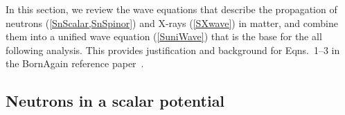 In this section, we review the wave equations that describe the propagation
of neutrons (\cref{SnScalar,SnSpinor}) and X-rays (\cref{SXwave}) in matter,
and combine them into a unified wave equation (\cref{SuniWave})
that is the base for the all following analysis.
This provides justification and background
for Eqns.~1--3 in the BornAgain reference paper~\cite{PoHB20}.

\subsection{Neutrons in a scalar potential}\label{SnScalar}
%
%

\def\Vmac{\tilde{V}}


